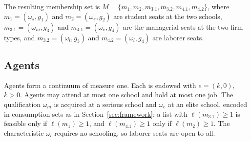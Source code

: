 \documentclass[12pt,letterpaper]{article}
\theoremstyle{definition}
\begin{document}
The resulting membership set is $M=\{m_1,m_2,m_{3.1},m_{3.2},m_{4.1},m_{4.2}\}$, where $m_1=(\omega_s,g_1)$ and $m_2=(\omega_s,g_2)$ are student seats at the two schools, $m_{3.1}=(\omega_m,g_3)$ and $m_{4.1}=(\omega_e,g_4)$ are the managerial seats at the two firm types, and $m_{3.2}=(\omega_l,g_3)$ and $m_{4.2}=(\omega_l,g_4)$ are laborer seats.

\subsection{Agents}

Agents form a continuum of measure one.
Each is endowed with $e=(k,0)$, $k>0$.
Agents may attend at most one school and hold at most one job.
The qualification $\omega_m$ is acquired at a serious school and $\omega_e$ at an elite school, encoded in consumption sets as in Section~\ref{sec:framework}: a list with $\ell(m_{3.1})\geq 1$ is feasible only if $\ell(m_1)\geq 1$, and $\ell(m_{4.1})\geq 1$ only if $\ell(m_2)\geq 1$.
The characteristic $\omega_l$ requires no schooling, so laborer seats are open to all.
\end{document}

